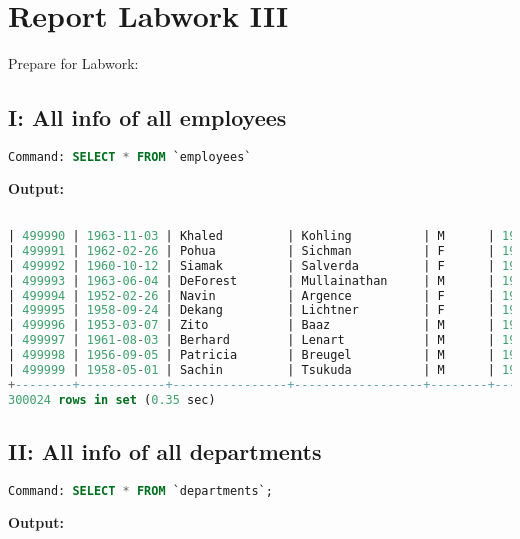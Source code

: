 \documentclass[12pt]{report}
\begin{document}
\section*{Report Labwork III}

Prepare for Labwork:

{\small
{}}
{\small
{}}
{\small
{}}

\subsection*{I: All info of all employees}

\begin{lstlisting}[language=sql]
Command: SELECT * FROM `employees`
\end{lstlisting}
\textbf{Output:}

\begin{lstlisting}[language=sql]

| 499990 | 1963-11-03 | Khaled         | Kohling          | M      | 1985-10-10 |
| 499991 | 1962-02-26 | Pohua          | Sichman          | F      | 1989-01-12 |
| 499992 | 1960-10-12 | Siamak         | Salverda         | F      | 1987-05-10 |
| 499993 | 1963-06-04 | DeForest       | Mullainathan     | M      | 1997-04-07 |
| 499994 | 1952-02-26 | Navin          | Argence          | F      | 1990-04-24 |
| 499995 | 1958-09-24 | Dekang         | Lichtner         | F      | 1993-01-12 |
| 499996 | 1953-03-07 | Zito           | Baaz             | M      | 1990-09-27 |
| 499997 | 1961-08-03 | Berhard        | Lenart           | M      | 1986-04-21 |
| 499998 | 1956-09-05 | Patricia       | Breugel          | M      | 1993-10-13 |
| 499999 | 1958-05-01 | Sachin         | Tsukuda          | M      | 1997-11-30 |
+--------+------------+----------------+------------------+--------+------------+
300024 rows in set (0.35 sec)

\end{lstlisting}


\subsection*{II: All info of all departments}

\begin{lstlisting}[language=sql]
Command: SELECT * FROM `departments`;
\end{lstlisting}
\textbf{Output:}
\end{document}
